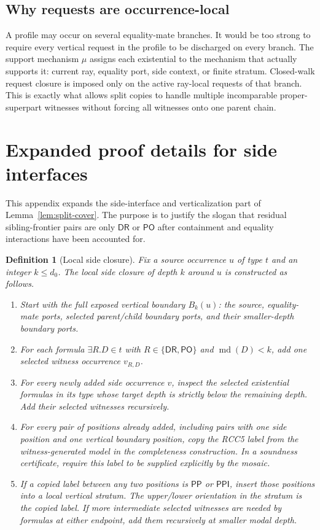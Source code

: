 \documentclass[11pt]{article}
\newtheorem{definition}[theorem]{Definition}
\newcommand{\DR}{\mathsf{DR}}
\newcommand{\PO}{\mathsf{PO}}
\newcommand{\PP}{\mathsf{PP}}
\newcommand{\PPI}{\mathsf{PPI}}
\newcommand{\md}{\operatorname{md}}
\begin{document}
\subsection{Why requests are occurrence-local}
A profile may occur on several equality-mate branches.  It would be too strong to require every vertical request in the profile to be discharged on every branch.  The support mechanism $\mu$ assigns each existential to the mechanism that actually supports it: current ray, equality port, side context, or finite stratum.  Closed-walk request closure is imposed only on the active ray-local requests of that branch.  This is exactly what allows split copies to handle multiple incomparable proper-superpart witnesses without forcing all witnesses onto one parent chain.



\section{Expanded proof details for side interfaces}

This appendix expands the side-interface and verticalization part of Lemma~\ref{lem:split-cover}.  The purpose is to justify the slogan that residual sibling-frontier pairs are only $\DR$ or $\PO$ after containment and equality interactions have been accounted for.

\begin{definition}[Local side closure]
Fix a source occurrence $u$ of type $t$ and an integer $k\le d_0$.  The local side closure of depth $k$ around $u$ is constructed as follows.
\begin{enumerate}[label=(LC\arabic*)]
\item Start with the full exposed vertical boundary $B_k(u)$: the source, equality-mate ports, selected parent/child boundary ports, and their smaller-depth boundary ports.
\item For each formula $\exists R.D\in t$ with $R\in\{\DR,\PO\}$ and $\md(D)<k$, add one selected witness occurrence $v_{R,D}$.
\item For every newly added side occurrence $v$, inspect the selected existential formulas in its type whose target depth is strictly below the remaining depth.  Add their selected witnesses recursively.
\item For every pair of positions already added, including pairs with one side position and one vertical boundary position, copy the RCC5 label from the witness-generated model in the completeness construction.  In a soundness certificate, require this label to be supplied explicitly by the mosaic.
\item If a copied label between any two positions is $\PP$ or $\PPI$, insert those positions into a local vertical stratum.  The upper/lower orientation in the stratum is the copied label.  If more intermediate selected witnesses are needed by formulas at either endpoint, add them recursively at smaller modal depth.
\end{enumerate}
\end{definition}
\end{document}
